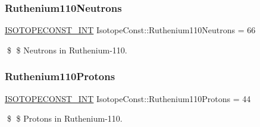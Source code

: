 \subsubsection{\texorpdfstring{Ruthenium110\+Neutrons}{Ruthenium110Neutrons}}
{\footnotesize\ttfamily \mbox{\hyperlink{group___isotope_const-_macros_ga5f18360b3e99483a35c32d789e62621c}{I\+S\+O\+T\+O\+P\+E\+C\+O\+N\+S\+T\+\_\+\+I\+NT}} Isotope\+Const\+::\+Ruthenium110\+Neutrons = 66}

\$ \$ Neutrons in Ruthenium-\/110. \mbox{\label{group___isotope_const-_ruthenium-_ru110_ga64c70292a18bf1181b8b9a61b5bb98c4}} 
\subsubsection{\texorpdfstring{Ruthenium110\+Protons}{Ruthenium110Protons}}
{\footnotesize\ttfamily \mbox{\hyperlink{group___isotope_const-_macros_ga5f18360b3e99483a35c32d789e62621c}{I\+S\+O\+T\+O\+P\+E\+C\+O\+N\+S\+T\+\_\+\+I\+NT}} Isotope\+Const\+::\+Ruthenium110\+Protons = 44}

\$ \$ Protons in Ruthenium-\/110. 